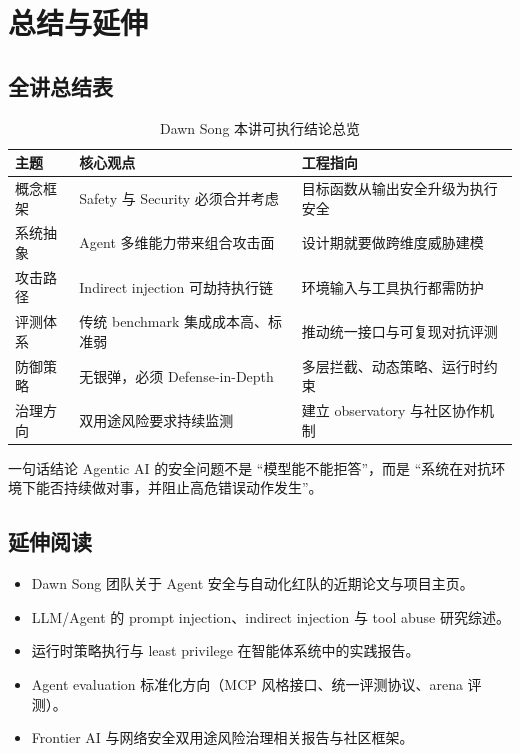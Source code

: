 \section{总结与延伸}

\subsection{全讲总结表}
\begin{table}[H]
\centering
\begin{tabular}{p{2.8cm}p{3.8cm}p{4.2cm}}
\toprule
\textbf{主题} & \textbf{核心观点} & \textbf{工程指向} \\
\midrule
概念框架 & Safety 与 Security 必须合并考虑 & 目标函数从输出安全升级为执行安全 \\
系统抽象 & Agent 多维能力带来组合攻击面 & 设计期就要做跨维度威胁建模 \\
攻击路径 & Indirect injection 可劫持执行链 & 环境输入与工具执行都需防护 \\
评测体系 & 传统 benchmark 集成成本高、标准弱 & 推动统一接口与可复现对抗评测 \\
防御策略 & 无银弹，必须 Defense-in-Depth & 多层拦截、动态策略、运行时约束 \\
治理方向 & 双用途风险要求持续监测 & 建立 observatory 与社区协作机制 \\
\bottomrule
\end{tabular}
\caption{Dawn Song 本讲可执行结论总览}
\end{table}

\begin{importantbox}{一句话结论}
Agentic AI 的安全问题不是 ``模型能不能拒答''，而是 ``系统在对抗环境下能否持续做对事，并阻止高危错误动作发生''。
\end{importantbox}

\subsection{延伸阅读}
\begin{itemize}
    \item Dawn Song 团队关于 Agent 安全与自动化红队的近期论文与项目主页。
    \item LLM/Agent 的 prompt injection、indirect injection 与 tool abuse 研究综述。
    \item 运行时策略执行与 least privilege 在智能体系统中的实践报告。
    \item Agent evaluation 标准化方向（MCP 风格接口、统一评测协议、arena 评测）。
    \item Frontier AI 与网络安全双用途风险治理相关报告与社区框架。
\end{itemize}


